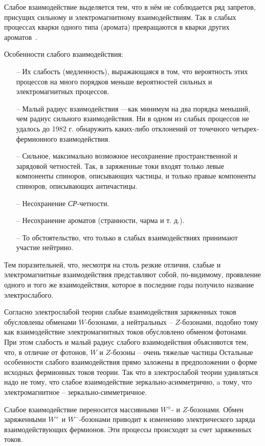 Слабое взаимодействие выделяется тем, что в нём не соблюдается ряд запретов, присущих сильному и электромагнитному взаимодействиям. Так в слабых процессах кварки одного типа (аромата) превращаются в кварки других ароматов~\cite{nuclphys:weak}.

Особенности слабого взаимодействия:
\begin{enumerate}
	\item[--] Их слабость (медленность), выражающаяся в том, что
	вероятность этих процессов на много порядков меньше
	вероятностей сильных и электромагнитных процессов.
	
	\item[--] Малый радиус взаимодействия —как минимум на
	два порядка меньший, чем радиус сильного взаимодействия.
	Ни в одном из слабых процессов не удалось до 1982 г. обнаружить каких-либо отклонений от точечного четырех-
	фермионного взаимодействия.
	
	\item[--] Сильное, максимально возможное несохранение пространственной и зарядовой четностей. Так, в заряженные
	токи входят только левые компоненты спиноров, описывающих частицы, и только правые компоненты спиноров,
	описывающих античастицы.
	
	\item[--] Несохранение \textit{СР}-четности.
	
	\item[--] Несохранение ароматов (странности, чарма и т. д.).
	
	\item[--]  То обстоятельство, что только в слабых взаимодействиях принимают участие нейтрино.
	
\end{enumerate}

Тем поразительней, что, несмотря на столь резкие отличия, слабые и электромагнитные взаимодействия представляют собой, по-видимому, проявление одного и того же
взаимодействия, которое в последние годы получило название электрослабого.

Согласно электрослабой теории слабые взаимодействия
заряженных токов обусловлены обменами $W$-бозонами, а
нейтральных -- $Z$-бозонами, подобно тому как взаимодействие электромагнитных токов обусловлено обменом фотонами. При этом слабость и малый радиус слабого взаимодействия объясняются тем, что, в отличие от фотонов, $W$ и $Z$-бозоны -- очень тяжелые частицы Остальные особенности слабого взаимодействия прямо заложены в предположении о форме исходных фермионных токов теории.
Так что в злектрослабой теории удивляться надо не тому,
что слабое взаимодействие зеркально-асимметрично, a тому, что электромагнитное -- зеркально-симметричное.

Слабое взаимодействие переносится массивными $W^±$- и $Z$-бозонами. Обмен заряженными $W^+$ и $W^-$-бозонами приводит к изменению электрического заряда взаимодействующих фермионов. Эти процессы происходят за счет заряженных токов.



